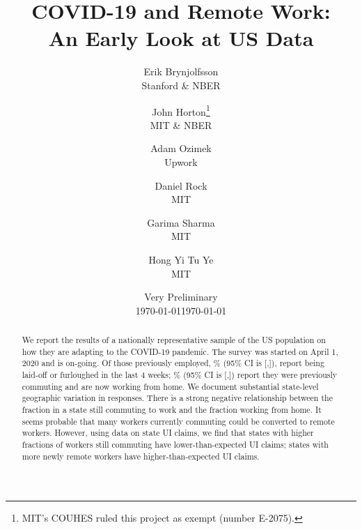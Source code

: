 \documentclass[12pt]{article}
\newcommand{\covid}{COVID-19}
\begin{document}
 

\title{COVID-19 and Remote Work:\\ An Early Look at US Data}

\date{Very Preliminary \\ \today}

\date{\today}

\author{Erik Brynjolfsson\\Stanford \& NBER \and John Horton\footnote{
    MIT's COUHES ruled this project as exempt (number E-2075).
  }\\MIT \& NBER \and Adam Ozimek\\Upwork \and Daniel Rock\\MIT \and Garima Sharma\\MIT \and Hong Yi Tu Ye\\MIT}


\maketitle

\begin{abstract}
  \noindent 
  We report the results of a nationally representative sample of the US population on how they are adapting to the \covid{} pandemic.
  The survey was started on April 1, 2020 and is on-going.
  Of those previously employed, \LaidOff{}\% (95\% CI is [\LaidOffLB,\LaidOffUB]), report being laid-off or furloughed in the last 4 weeks;
  \WFH{}\% (95\% CI is [\WFHLB,\WFHUB]) report they were previously commuting and are now working from home.
  We document substantial state-level geographic variation in responses.
  There is a strong negative relationship between the fraction in a state still commuting to work and the fraction working from home. 
  It seems probable that many workers currently commuting could be converted to remote workers. 
  However, using data on state UI claims, we find that states with higher fractions of workers still commuting have lower-than-expected UI claims; states with more newly remote workers have higher-than-expected UI claims.
  \newline 
\end{abstract} 


\onehalfspacing 
\end{document}
